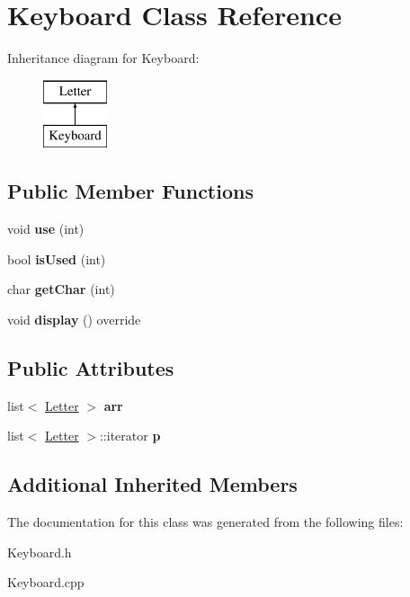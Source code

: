 \hypertarget{class_keyboard}{}\section{Keyboard Class Reference}
\label{class_keyboard}
Inheritance diagram for Keyboard\+:\begin{figure}[H]
\begin{center}
\leavevmode
\includegraphics[height=2.000000cm]{class_keyboard}
\end{center}
\end{figure}
\subsection*{Public Member Functions}
\begin{DoxyCompactItemize}
\item 
\hypertarget{class_keyboard_a031496ee6360d3b86fb7e4e16452a080}{}\label{class_keyboard_a031496ee6360d3b86fb7e4e16452a080} 
void {\bfseries use} (int)
\item 
\hypertarget{class_keyboard_a2d598a80c667ed2de18dc7d373ff55e1}{}\label{class_keyboard_a2d598a80c667ed2de18dc7d373ff55e1} 
bool {\bfseries is\+Used} (int)
\item 
\hypertarget{class_keyboard_ac21a1ed09c603ae427de9981fea50f63}{}\label{class_keyboard_ac21a1ed09c603ae427de9981fea50f63} 
char {\bfseries get\+Char} (int)
\item 
\hypertarget{class_keyboard_aed02d9f56fb12f4cec1129de092913d1}{}\label{class_keyboard_aed02d9f56fb12f4cec1129de092913d1} 
void {\bfseries display} () override
\end{DoxyCompactItemize}
\subsection*{Public Attributes}
\begin{DoxyCompactItemize}
\item 
\hypertarget{class_keyboard_a8ece3422c2741daac0eb4b7b1c811cdd}{}\label{class_keyboard_a8ece3422c2741daac0eb4b7b1c811cdd} 
list$<$ \hyperlink{class_letter}{Letter} $>$ {\bfseries arr}
\item 
\hypertarget{class_keyboard_a6cb495b8b224967a8ed22ec069932d07}{}\label{class_keyboard_a6cb495b8b224967a8ed22ec069932d07} 
list$<$ \hyperlink{class_letter}{Letter} $>$\+::iterator {\bfseries p}
\end{DoxyCompactItemize}
\subsection*{Additional Inherited Members}


The documentation for this class was generated from the following files\+:\begin{DoxyCompactItemize}
\item 
Keyboard.\+h\item 
Keyboard.\+cpp\end{DoxyCompactItemize}
